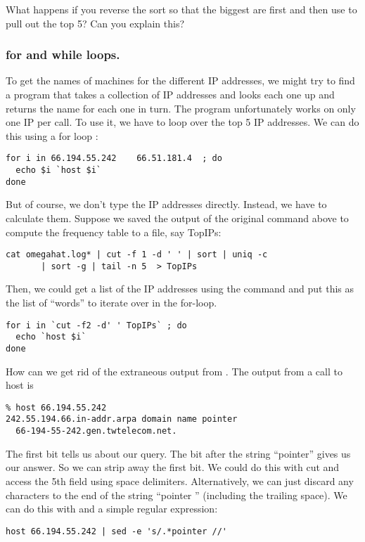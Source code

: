 \begin{enumerate}
What happens if you reverse the sort so that the biggest are first and
then use  to pull out the top 5? Can you explain this?

\subsubsection{for and while loops.}
To get the names of machines for the different IP addresses, we might
try to find a program that takes a collection of IP addresses
and looks each one up and returns the name for each one in turn.
The program  unfortunately works on only
one IP per call. To use it, we have to loop over the top 5 IP addresses.
We can do this using a for loop :
\begin{verbatim}
for i in 66.194.55.242    66.51.181.4  ; do
  echo $i `host $i`
done
\end{verbatim}
But of course, we don't type the IP addresses directly.
Instead, we have to calculate them.
Suppose we saved the output of the original command above
to compute the frequency table to a file, say TopIPs:
\begin{verbatim}
cat omegahat.log* | cut -f 1 -d ' ' | sort | uniq -c 
       | sort -g | tail -n 5  > TopIPs
\end{verbatim}
Then, we could get a list of the IP addresses using
the  command and put this as the list
of ``words'' to iterate over in the for-loop.
\begin{verbatim}
for i in `cut -f2 -d' ' TopIPs` ; do
  echo `host $i`
done
\end{verbatim}

How can we get rid of the extraneous output from .
The output from a call to host is
\begin{verbatim}
% host 66.194.55.242
242.55.194.66.in-addr.arpa domain name pointer 
  66-194-55-242.gen.twtelecom.net.
\end{verbatim}
The first bit tells us about our query.
The bit after the string ``pointer''  gives us our answer.
So we can strip away the first bit.
We could do this with cut and access the 5th field using space
delimiters.
Alternatively, we can just discard any characters to the end of 
the string ``pointer '' (including the trailing space).
We can do this with 
and a simple regular expression:
\begin{verbatim}
host 66.194.55.242 | sed -e 's/.*pointer //'
\end{verbatim}



\end{enumerate}
